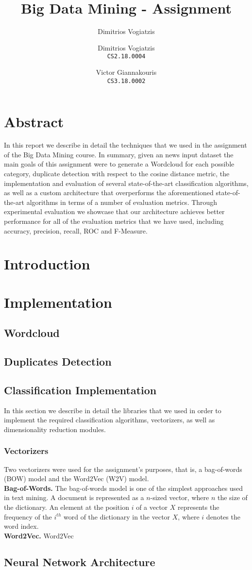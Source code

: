 \documentclass[]{article}
\title{Big Data Mining - Assignment}
\author{Dimitrios Vogiatzis}
\author{
	Dimitrios Vogiatzis\\
	\texttt{CS2.18.0004}
	\and
	Victor Giannakouris\\
	\texttt{CS3.18.0002}
}
\begin{document}
\date{}
\maketitle

\section{Abstract}
In this report we describe in detail the techniques that we used in the assignment of the Big Data Mining course. In summary, given an news input dataset the main goals of this assignment were to generate a Wordcloud for each possible category, duplicate detection with respect to the cosine distance metric, the implementation and evaluation of several state-of-the-art classification algorithms, as well as a custom architecture that overperforms the aforementioned state-of-the-art algorithms in terms of a number of evaluation metrics. Through experimental evaluation we showcase that our architecture achieves better performance for all of the evaluation metrics that we have used, including accuracy, precision, recall, ROC and F-Measure.
\section{Introduction}

\section{Implementation}
\subsection{Wordcloud}
\subsection{Duplicates Detection}
\subsection{Classification Implementation}
In this section we describe in detail the libraries that we used in order to implement the required classification algorithms, vectorizers, as well as dimensionality reduction modules.
%
\subsubsection{Vectorizers}
Two vectorizers were used for the assignment’s purposes, that is, a bag-of-words (BOW) model and the Word2Vec (W2V) model.
\\
\textbf{Bag-of-Words.} The bag-of-words \cite{BoW} model is one of the simplest approaches used in text mining. A document is represented as a $n$-sized vector, where $n$ the size of the dictionary. An element at the position $i$ of a vector $X$ represents the frequency of the $i^{th}$ word of the dictionary in the vector $X$, where $i$ denotes the word index.
\\
\textbf{Word2Vec.} Word2Vec \cite{mikolov2013distributed}

\subsection{Neural Network Architecture}



\end{document}
